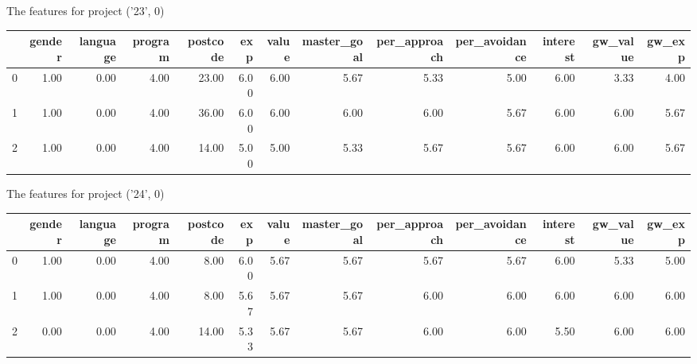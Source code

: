 \documentclass[7pt]{article}
\begin{document}
\begin{landscape}
The features for project ('23', 0)\newline
\begin{tabular}{lrrrrrrrrrrrr}
\toprule
{} &  gender &  language &  program &  postcode &  exp &  value &  master\_goal &  per\_approach &  per\_avoidance &  interest &  gw\_value &  gw\_exp \\
\midrule
0 &    1.00 &      0.00 &     4.00 &     23.00 & 6.00 &   6.00 &         5.67 &          5.33 &           5.00 &      6.00 &             3.33 &           4.00 \\
1 &    1.00 &      0.00 &     4.00 &     36.00 & 6.00 &   6.00 &         6.00 &          6.00 &           5.67 &      6.00 &             6.00 &           5.67 \\
2 &    1.00 &      0.00 &     4.00 &     14.00 & 5.00 &   5.00 &         5.33 &          5.67 &           5.67 &      6.00 &             6.00 &           5.67 \\
\bottomrule
\end{tabular}

The features for project ('24', 0)\newline
\begin{tabular}{lrrrrrrrrrrrr}
\toprule
{} &  gender &  language &  program &  postcode &  exp &  value &  master\_goal &  per\_approach &  per\_avoidance &  interest &  gw\_value &  gw\_exp \\
\midrule
0 &    1.00 &      0.00 &     4.00 &      8.00 & 6.00 &   5.67 &         5.67 &          5.67 &           5.67 &      6.00 &             5.33 &           5.00 \\
1 &    1.00 &      0.00 &     4.00 &      8.00 & 5.67 &   5.67 &         5.67 &          6.00 &           6.00 &      6.00 &             6.00 &           6.00 \\
2 &    0.00 &      0.00 &     4.00 &     14.00 & 5.33 &   5.67 &         5.67 &          6.00 &           6.00 &      5.50 &             6.00 &           6.00 \\
\bottomrule
\end{tabular}


\end{landscape}
\end{document}
